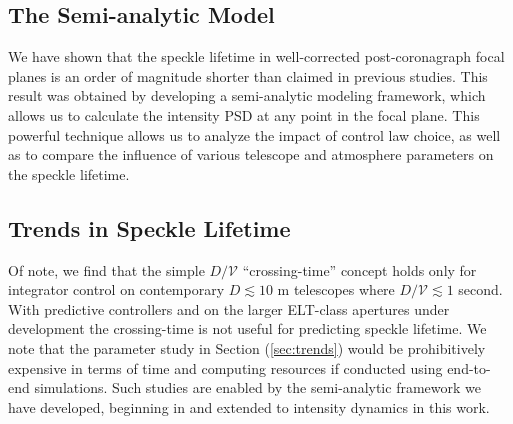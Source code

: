 \documentclass[10pt,preprint]{aastex631}
\begin{document}
\subsection{The Semi-analytic Model}

We have shown that the speckle lifetime in well-corrected post-coronagraph focal planes is an order of magnitude shorter than claimed in previous studies.  This result was obtained by developing a semi-analytic modeling framework, which allows us to calculate the intensity PSD at any point in the focal plane.  This powerful technique allows us to analyze the impact of control law choice, as well as to compare the influence of various telescope and atmosphere parameters on the speckle lifetime.  

\subsection{Trends in Speckle Lifetime}

Of note, we find that the simple $D/\mathcal{V}$ ``crossing-time'' concept holds only for integrator control on contemporary $D\lesssim10$ m telescopes where $D/\mathcal{V} \lesssim 1$ second.  With predictive controllers and on the larger ELT-class apertures under development the crossing-time is not useful for predicting speckle lifetime.  We  note that the parameter study in Section (\ref{sec:trends}) would be prohibitively expensive in terms of time and computing resources if conducted using end-to-end simulations.  Such studies are enabled by the semi-analytic framework we have developed, beginning in \citep{2018JATIS...4a9001M} and extended to intensity dynamics in this work.
\end{document}
